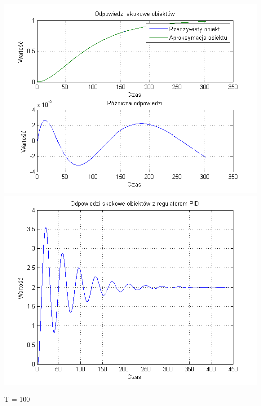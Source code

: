 \documentclass[10pt,a4paper]{article}
\begin{document}
\begin{center}
\includegraphics[scale=1]{images/dwa/skrypt_77.png}\\
\includegraphics[scale=1]{images/dwa/skrypt_78.png}\\
\end{center}
\newpage
T = 100
\end{document}
